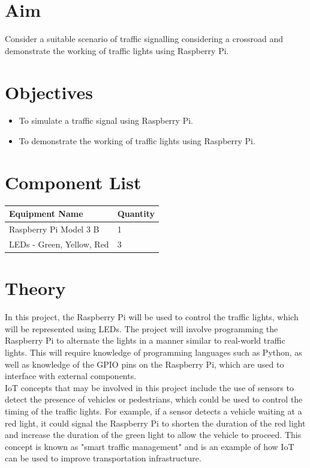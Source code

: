 \documentclass[11pt]{article}
\begin{document}
\tableofcontents
\thispagestyle{empty}
\clearpage

\setcounter{page}{1}

\section{Aim}
Consider a suitable scenario of traffic signalling considering a crossroad and demonstrate the working of traffic lights using Raspberry Pi.
\section{Objectives}
\begin{itemize}
	\item To simulate a traffic signal using Raspberry Pi.
	\item To demonstrate the working of traffic lights using Raspberry Pi.
\end{itemize}

\section{Component List}
\begin{table}[H]
	\begin{tabular}{|l|l|}
		\hline
		\textbf{Equipment Name}   & \textbf{Quantity} \\ \hline
		Raspberry Pi Model 3 B    & 1                 \\ \hline
		LEDs - Green, Yellow, Red & 3                 \\ \hline
	\end{tabular}
\end{table}
\section{Theory}

In this project, the Raspberry Pi will be used to control the traffic lights, which will be represented using LEDs. The project will involve programming the Raspberry Pi to alternate the lights in a manner similar to real-world traffic lights. This will require knowledge of programming languages such as Python, as well as knowledge of the GPIO pins on the Raspberry Pi, which are used to interface with external components.\\

IoT concepts that may be involved in this project include the use of sensors to detect the presence of vehicles or pedestrians, which could be used to control the timing of the traffic lights. For example, if a sensor detects a vehicle waiting at a red light, it could signal the Raspberry Pi to shorten the duration of the red light and increase the duration of the green light to allow the vehicle to proceed. This concept is known as "smart traffic management" and is an example of how IoT can be used to improve transportation infrastructure.\\
\end{document}
